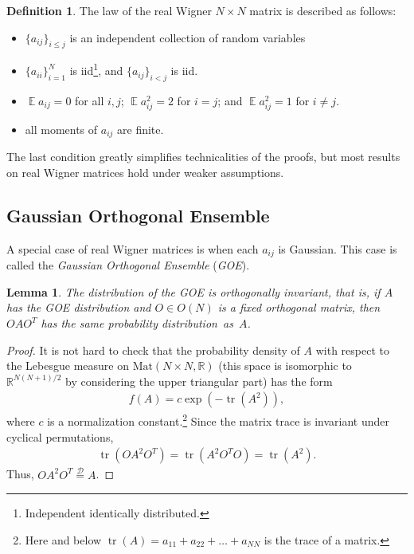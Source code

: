 \documentclass[letterpaper,11pt,oneside,reqno]{amsart}
\numberwithin{equation}{section}
\DeclareMathOperator{\EE}{\mathbb{E}}
\newtheorem{lemma}[proposition]{Lemma}
\theoremstyle{definition}
\newtheorem{definition}[proposition]{Definition}
\begin{document}
\begin{definition}\label{def:real_Wigner}
The law of the real Wigner $N\times N$ matrix is described as follows:
\begin{itemize}
	\item $\{a_{ij}\}_{i\leq j}$ is an independent collection of random variables
	\item $\{a_{ii}\}_{i=1}^N$ is iid\footnote{Independent identically
	distributed.}, and $\{a_{ij}\}_{i<j}$ is iid.
	\item $\EE a_{ij}=0$ for all $i,j$; $\EE a_{ij}^2=2$ for $i=j$; and $\EE a_{ij}^2=1$ for $i\neq j$.
	\item all moments of $a_{ij}$ are finite.
\end{itemize}
The last condition greatly simplifies technicalities of the proofs,
but most results on real Wigner matrices hold under weaker assumptions.
\end{definition}


\subsection{Gaussian Orthogonal Ensemble} %
\label{sub:gaussian_orthogonal_ensemble}

A special case of real Wigner matrices  is when each $a_{ij}$ is Gaussian.
This case is called the \emph{Gaussian Orthogonal Ensemble} (\emph{GOE}).

\begin{lemma}
	The distribution of the GOE is orthogonally invariant, that is,
	if $A$ has the GOE distribution and $O\in O(N)$ is a fixed
	orthogonal matrix, then $OAO^{T}$ has the same probability distribution~as~$A$.
\end{lemma}
\begin{proof}
	It is not hard to check that the
	probability density of $A$ with respect to the 
	Lebesgue measure on $\mathrm{Mat}(N\times N,\mathbb R)$
	(this space is isomorphic to $\mathbb{R}^{N(N+1)/2}$
	by considering the upper triangular part)
	has the form
	\begin{align*}
		f(A)=c \exp(-\mathop{\mathrm{tr}}(A^2)),
	\end{align*}
	where $c$ is a normalization constant.\footnote{Here 
	and below $\mathop{\mathrm{tr}}(A)=a_{11}+a_{22}+\ldots+a_{NN}$ 
	is the trace of a matrix.}  Since the matrix trace
	is invariant under cyclical permutations, 
	\begin{align*}
		\mathop{\mathrm{tr}}(OA^2O^{T})
		=\mathop{\mathrm{tr}}(A^2O^{T}O)
		=\mathop{\mathrm{tr}}(A^2).
	\end{align*}
	Thus, $OA^2O^{T}\stackrel{\mathcal D}{=} A$.
\end{proof}
\end{document}
